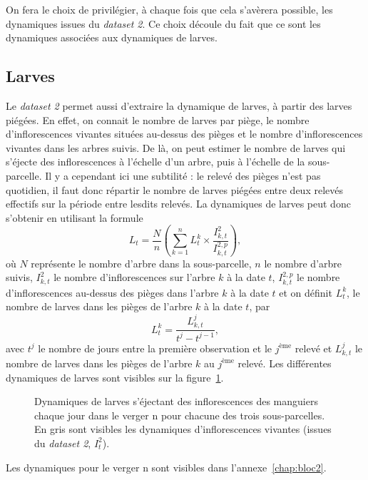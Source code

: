 On fera le choix de privilégier, à chaque fois que cela s'avèrera possible, les dynamiques issues du \emph{dataset 2}.
Ce choix découle du fait que ce sont les dynamiques associées aux dynamiques de larves.


\subsection{Larves}

Le \emph{dataset 2} permet aussi d'extraire la dynamique de larves, à partir des larves piégées.
En effet, on connait le nombre de larves par piège, le nombre d'inflorescences vivantes situées au-dessus des pièges et le nombre d'inflorescences vivantes dans les arbres suivis.
De là, on peut estimer le nombre de larves qui s'éjecte des inflorescences à l'échelle d'un arbre, puis à l'échelle de la sous-parcelle.
Il y a cependant ici une subtilité : le relevé des pièges n'est pas quotidien, il faut donc répartir le nombre de larves piégées entre deux relevés effectifs sur la période entre lesdits relevés.
La dynamiques de larves peut donc s'obtenir en utilisant la formule 
\[
L_t = \frac{N}{n}\left(\sum_{k = 1}^n L_{t}^{k} \times \frac{I_{k, t}^{2}}{I_{k, t}^{2, p}} \right),
\]
où $N$ représente le nombre d'arbre dans la sous-parcelle, $n$ le nombre d'arbre suivis, $I^{2}_{k, t}$ le nombre d'inflorescences sur l'arbre $k$ à la date $t$, $I^{2, p}_{k, t}$ le nombre d'inflorescences au-dessus des pièges dans l'arbre $k$ à la date $t$ et on définit $L_t^k$, le nombre de larves dans les pièges de l’arbre $k$ à la date $t$, par
\[
L_t^k = \frac{L_{k, t}^j}{t^j - t^{j-1}},
\]
avec $t^j$  le nombre de jours entre la première observation et le $j^{\text{ème}}$ relevé et $L_{k, t}^j$ le nombre de larves dans les pièges de l'arbre $k$ au $j^{\text{ème}}$ relevé.
Les différentes dynamiques de larves sont visibles sur la figure~\ref{fig:larves}.
\begin{figure}[ht]
\centering
{}
\caption{Dynamiques de larves s'éjectant des inflorescences des manguiers chaque jour dans le verger n pour chacune des trois sous-parcelles. En gris sont visibles les dynamiques d'inflorescences vivantes (issues du \emph{dataset 2}, $I^2_t$).}
\label{fig:larves}
\end{figure}

Les dynamiques pour le verger n sont visibles dans l'annexe~\ref{chap:bloc2}.
